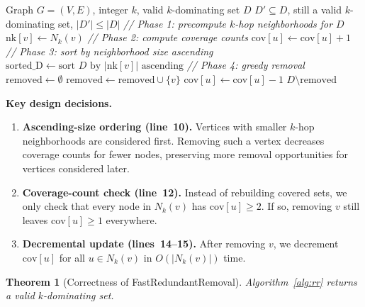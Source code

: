 \documentclass[11pt,a4paper]{article}
\newtheorem{theorem}{Theorem}
\newcommand{\cov}{\mathrm{cov}}
\begin{document}
\begin{algorithm}[ht]
\caption{FastRedundantRemoval$(G, k, D)$}
\label{alg:rr}
\begin{algorithmic}[1]
\Require Graph $G=(V,E)$, integer $k$, valid $k$-dominating set $D$
\Ensure $D'\subseteq D$, still a valid $k$-dominating set, $|D'|\le|D|$
\Statex \textit{// Phase 1: precompute $k$-hop neighborhoods for $D$}
  \State $\text{nk}[v]\gets N_k(v)$ 
\EndFor
\Statex \textit{// Phase 2: compute coverage counts}
    \State $\cov[u]\gets\cov[u]+1$
  \EndFor
\EndFor
\Statex \textit{// Phase 3: sort by neighborhood size ascending}
\State $\text{sorted\_D}\gets\text{sort } D \text{ by } |\text{nk}[v]| \text{ ascending}$
\Statex \textit{// Phase 4: greedy removal}
\State $\text{removed}\gets\emptyset$
  \If{$\min\{\cov[u]:u\in\text{nk}[v]\}\ge 2$}
    \State $\text{removed}\gets\text{removed}\cup\{v\}$
      \State $\cov[u]\gets\cov[u]-1$
    \EndFor
  \EndIf
\EndFor
\State \Return $D\setminus\text{removed}$
\end{algorithmic}
\end{algorithm}

\textbf{Key design decisions.}
\begin{enumerate}[nosep,label=(\alph*)]
\item \textbf{Ascending-size ordering (line~10).}
  Vertices with smaller $k$-hop neighborhoods are considered first.
  Removing such a vertex decreases coverage counts for fewer nodes,
  preserving more removal opportunities for vertices considered later.
\item \textbf{Coverage-count check (line~12).}
  Instead of rebuilding covered sets, we only check that every node in
  $N_k(v)$ has $\cov[u]\ge 2$. If so, removing $v$ still leaves
  $\cov[u]\ge 1$ everywhere.
\item \textbf{Decremental update (lines~14--15).}
  After removing $v$, we decrement $\cov[u]$ for all $u\in N_k(v)$ in
  $O(|N_k(v)|)$ time.
\end{enumerate}

\begin{theorem}[Correctness of FastRedundantRemoval]
\label{thm:rr-correct}
Algorithm~\ref{alg:rr} returns a valid $k$-dominating set.
\end{theorem}
\end{document}
